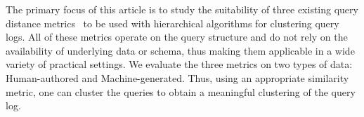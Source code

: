 The primary focus of this article is to study the suitability of three existing query distance metrics~\cite{aouiche2006,aligon2014similarity,makiyama2015text} to be used with hierarchical algorithms for clustering query logs. All of these metrics operate on the query structure and do not rely on the availability of underlying data or schema, thus making them applicable in a wide variety of practical settings. 
We evaluate the three metrics on two types of data: Human-authored and Machine-generated.
Thus, using an appropriate similarity metric, one can cluster the queries to obtain a meaningful clustering of the query log. %

